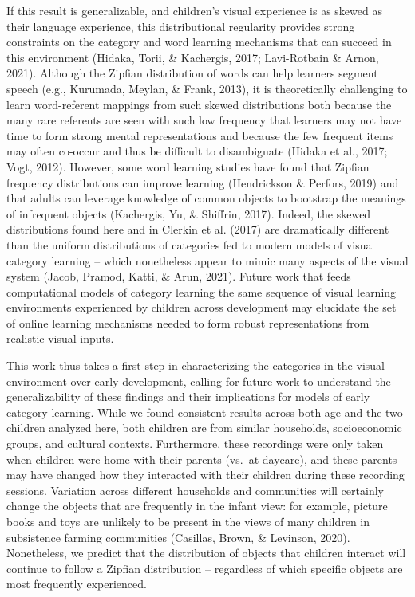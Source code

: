\documentclass[10pt, letterpaper]{article}
\begin{document}
If this result is generalizable, and children's visual experience is as
skewed as their language experience, this distributional regularity
provides strong constraints on the category and word learning mechanisms
that can succeed in this environment (Hidaka, Torii, \& Kachergis, 2017;
Lavi-Rotbain \& Arnon, 2021). Although the Zipfian distribution of words
can help learners segment speech (e.g., Kurumada, Meylan, \& Frank,
2013), it is theoretically challenging to learn word-referent mappings
from such skewed distributions both because the many rare referents are
seen with such low frequency that learners may not have time to form
strong mental representations and because the few frequent items may
often co-occur and thus be difficult to disambiguate (Hidaka et al.,
2017; Vogt, 2012). However, some word learning studies have found that
Zipfian frequency distributions can improve learning (Hendrickson \&
Perfors, 2019) and that adults can leverage knowledge of common objects
to bootstrap the meanings of infrequent objects (Kachergis, Yu, \&
Shiffrin, 2017). Indeed, the skewed distributions found here and in
Clerkin et al. (2017) are dramatically different than the uniform
distributions of categories fed to modern models of visual category
learning -- which nonetheless appear to mimic many aspects of the visual
system (Jacob, Pramod, Katti, \& Arun, 2021). Future work that feeds
computational models of category learning the same sequence of visual
learning environments experienced by children across development may
elucidate the set of online learning mechanisms needed to form robust
representations from realistic visual inputs.

This work thus takes a first step in characterizing the categories in
the visual environment over early development, calling for future work
to understand the generalizability of these findings and their
implications for models of early category learning. While we found
consistent results across both age and the two children analyzed here,
both children are from similar households, socioeconomic groups, and
cultural contexts. Furthermore, these recordings were only taken when
children were home with their parents (vs.~at daycare), and these
parents may have changed how they interacted with their children during
these recording sessions. Variation across different households and
communities will certainly change the objects that are frequently in the
infant view: for example, picture books and toys are unlikely to be
present in the views of many children in subsistence farming communities
(Casillas, Brown, \& Levinson, 2020). Nonetheless, we predict that the
distribution of objects that children interact will continue to follow a
Zipfian distribution -- regardless of which specific objects are most
frequently experienced.
\end{document}
